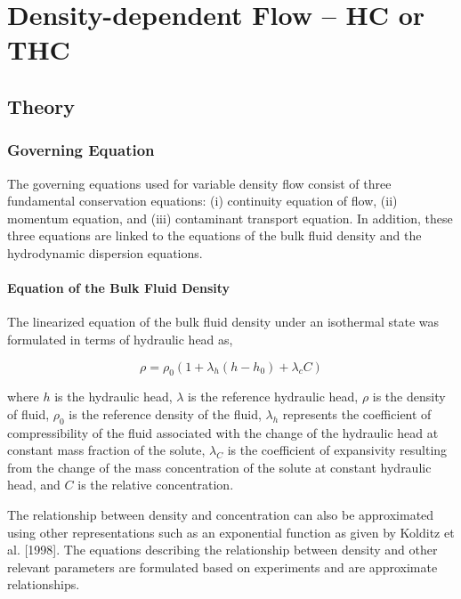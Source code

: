 \chapter{Density-dependent Flow -- HC or THC}

\section{Theory}
\subsection{Governing Equation}\label{SS:GoverningEquation}
The governing equations used for variable density flow consist of
three fundamental conservation equations: (i) continuity equation of
flow, (ii) momentum equation, and (iii) contaminant transport
equation. In addition, these three equations are linked to the
equations of the bulk fluid density and the hydrodynamic dispersion
equations.

\subsubsection{Equation of the Bulk Fluid Density}\label{SS:BulkFluidDensity}
The linearized equation of the bulk fluid density under an
isothermal state was formulated in terms of hydraulic head as,

\begin{equation}\label{bulkfluiddensity}
\rho  = \rho _0 \left( {1 + \lambda _h \left( {h - h_0 } \right) +
\lambda _c C} \right)
\end{equation}

where $h$ is the hydraulic head, $\lambda$ is the reference
hydraulic head, $\rho$ is the density of fluid, $\rho _0$ is the
reference density of the fluid, $\lambda _h$ represents the
coefficient of compressibility of the fluid associated with the
change of the hydraulic head at constant mass fraction of the
solute, $\lambda _C$ is the coefficient of expansivity resulting
from the change of the mass concentration of the solute at constant
hydraulic head, and $C$ is the relative concentration.

The relationship between density and concentration can also be
approximated using other representations such as an exponential
function as given by Kolditz et al. [1998]. The equations describing
the relationship between density and other relevant parameters are
formulated based on experiments and are approximate relationships.

